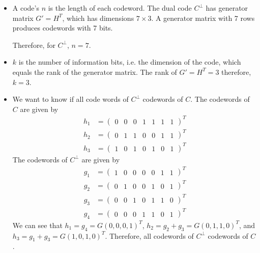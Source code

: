 \begin{itemize}
    \item A code's $n$ is the length of each codeword. The dual code $C^\perp$ has generator matrix $G' = H^T$, which has dimensions $7 \times 3$. A generator matrix with 7 rows produces codewords with 7 bits. 
        
    Therefore, for $C^\perp$, $n = 7$. 
    \item $k$ is the number of information bits, i.e. the dimension of the code, which equals the rank of the generator matrix. The rank of $G'=H^T = 3$ therefore, $k=3$. 
    \item We want to know if all code words of $C^\perp$ codewords of $C$. The codewords of $C$ are given by 
    \begin{align}
        h_1 &= \begin{pmatrix}0 & 0 & 0 & 1 & 1 & 1 & 1 \end{pmatrix}^T\\
        h_2 &= \begin{pmatrix}0 & 1 & 1 & 0 & 0 & 1 & 1 \end{pmatrix}^T \\
        h_3 &= \begin{pmatrix}1 & 0 & 1 & 0 & 1 & 0 & 1 \end{pmatrix}^T 
    \end{align}
    The codewords of $C^\perp$ are given by
    \begin{align}
        g_1 &= \begin{pmatrix}1 & 0 & 0 & 0 & 0 & 1 & 1 \end{pmatrix}^T\\
        g_2 &= \begin{pmatrix}0 & 1 & 0 & 0 & 1 & 0 & 1 \end{pmatrix}^T \\
        g_3 &= \begin{pmatrix}0 & 0 & 1 & 0 & 1 & 1 & 0 \end{pmatrix}^T \\
        g_4 &= \begin{pmatrix}0 & 0 & 0 & 1 & 1 & 0 & 1 \end{pmatrix}^T 
    \end{align}
    We can see that $h_1 = g_4 = G(0,0,0,1)^T$, $h_2 = g_2 + g_3 = G(0,1,1,0)^T$, and $h_3 = g_1 + g_3 = G(1,0,1,0)^T$. Therefore, all codewords of $C^\perp$ codewords of $C$.
    
\end{itemize}